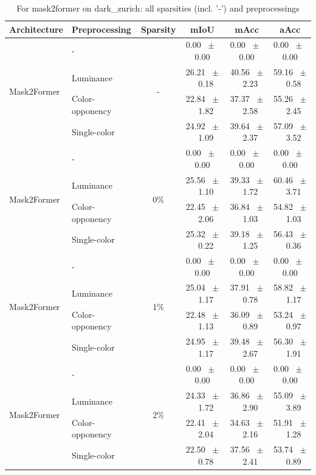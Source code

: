 \begin{table}[h]
  \centering
  \caption{For mask2former on dark_zurich: all sparsities (incl. '-') and preprocessings}
  \begin{tabular}{@{}l l c c c c@{}}
    \toprule
    Architecture & Preprocessing & Sparsity & mIoU & mAcc & aAcc \\
    \midrule
    \multirow{4}{*}{Mask2Former} & - & \multirow{4}{*}{-} & 0.00 ~$\pm$~ 0.00 & 0.00 ~$\pm$~ 0.00 & 0.00 ~$\pm$~ 0.00 \\
    & Luminance &  & 26.21 ~$\pm$~ 0.18 & 40.56 ~$\pm$~ 2.23 & 59.16 ~$\pm$~ 0.58 \\
    & Color-opponency &  & 22.84 ~$\pm$~ 1.82 & 37.37 ~$\pm$~ 2.58 & 55.26 ~$\pm$~ 2.45 \\
    & Single-color &  & 24.92 ~$\pm$~ 1.09 & 39.64 ~$\pm$~ 2.37 & 57.09 ~$\pm$~ 3.52 \\
    \midrule
    \multirow{4}{*}{Mask2Former} & - & \multirow{4}{*}{0\%} & 0.00 ~$\pm$~ 0.00 & 0.00 ~$\pm$~ 0.00 & 0.00 ~$\pm$~ 0.00 \\
    & Luminance &  & 25.56 ~$\pm$~ 1.10 & 39.33 ~$\pm$~ 1.72 & 60.46 ~$\pm$~ 3.71 \\
    & Color-opponency &  & 22.45 ~$\pm$~ 2.06 & 36.84 ~$\pm$~ 1.03 & 54.82 ~$\pm$~ 1.03 \\
    & Single-color &  & 25.32 ~$\pm$~ 0.22 & 39.18 ~$\pm$~ 1.25 & 56.43 ~$\pm$~ 0.36 \\
    \midrule
    \multirow{4}{*}{Mask2Former} & - & \multirow{4}{*}{1\%} & 0.00 ~$\pm$~ 0.00 & 0.00 ~$\pm$~ 0.00 & 0.00 ~$\pm$~ 0.00 \\
    & Luminance &  & 25.04 ~$\pm$~ 1.17 & 37.91 ~$\pm$~ 0.78 & 58.82 ~$\pm$~ 1.17 \\
    & Color-opponency &  & 22.48 ~$\pm$~ 1.13 & 36.09 ~$\pm$~ 0.89 & 53.24 ~$\pm$~ 0.97 \\
    & Single-color &  & 24.95 ~$\pm$~ 1.17 & 39.48 ~$\pm$~ 2.67 & 56.30 ~$\pm$~ 1.91 \\
    \midrule
    \multirow{4}{*}{Mask2Former} & - & \multirow{4}{*}{2\%} & 0.00 ~$\pm$~ 0.00 & 0.00 ~$\pm$~ 0.00 & 0.00 ~$\pm$~ 0.00 \\
    & Luminance &  & 24.33 ~$\pm$~ 1.72 & 36.86 ~$\pm$~ 2.90 & 55.09 ~$\pm$~ 3.89 \\
    & Color-opponency &  & 22.41 ~$\pm$~ 2.04 & 34.63 ~$\pm$~ 2.16 & 51.91 ~$\pm$~ 1.28 \\
    & Single-color &  & 22.50 ~$\pm$~ 0.78 & 37.56 ~$\pm$~ 2.41 & 53.74 ~$\pm$~ 0.89 \\
    \midrule

\end{tabular}
\end{table}
